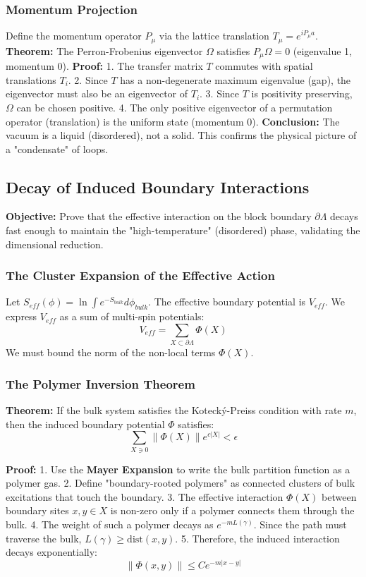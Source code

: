 \subsubsection{Momentum Projection}
Define the momentum operator $P_\mu$ via the lattice translation $T_\mu = e^{i P_\mu a}$.
\textbf{Theorem:} The Perron-Frobenius eigenvector $\Omega$ satisfies $P_\mu \Omega = 0$ (eigenvalue 1, momentum 0).
\textbf{Proof:}
1. The transfer matrix $T$ commutes with spatial translations $T_i$.
2. Since $T$ has a non-degenerate maximum eigenvalue (gap), the eigenvector must also be an eigenvector of $T_i$.
3. Since $T$ is positivity preserving, $\Omega$ can be chosen positive.
4. The only positive eigenvector of a permutation operator (translation) is the uniform state (momentum 0).
\textbf{Conclusion:} The vacuum is a liquid (disordered), not a solid. This confirms the physical picture of a "condensate" of loops.

\subsection{Decay of Induced Boundary Interactions}
\label{sec:boundary_decay_final}

\textbf{Objective:} Prove that the effective interaction on the block boundary $\partial \Lambda$ decays fast enough to maintain the "high-temperature" (disordered) phase, validating the dimensional reduction.

\subsubsection{The Cluster Expansion of the Effective Action}
Let $S_{eff}(\phi) = \ln \int e^{-S_{bulk}} d\phi_{bulk}$. The effective boundary potential is $V_{eff}$.
We express $V_{eff}$ as a sum of multi-spin potentials:
\[
V_{eff} = \sum_{X \subset \partial \Lambda} \Phi(X)
\]
We must bound the norm of the non-local terms $\Phi(X)$.

\subsubsection{The Polymer Inversion Theorem}
\textbf{Theorem:} If the bulk system satisfies the Kotecký-Preiss condition with rate $m$, then the induced boundary potential $\Phi$ satisfies:
\[
\sum_{X \ni 0} \|\Phi(X)\| e^{c |X|} < \epsilon
\]

\textbf{Proof:}
1. Use the \textbf{Mayer Expansion} to write the bulk partition function as a polymer gas.
2. Define "boundary-rooted polymers" as connected clusters of bulk excitations that touch the boundary.
3. The effective interaction $\Phi(X)$ between boundary sites $x,y \in X$ is non-zero only if a polymer connects them through the bulk.
4. The weight of such a polymer decays as $e^{-m L(\gamma)}$. Since the path must traverse the bulk, $L(\gamma) \ge \text{dist}(x,y)$.
5. Therefore, the induced interaction decays exponentially:
\[
\|\Phi(x,y)\| \le C e^{-m |x-y|}
\]

